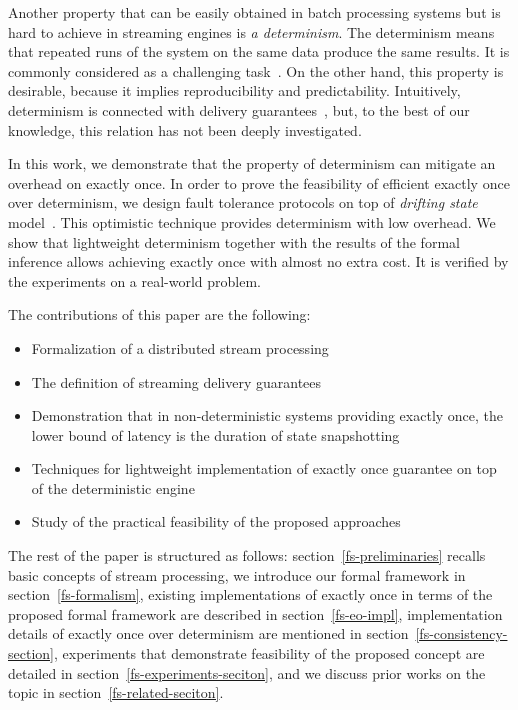 Another property that can be easily obtained in batch processing systems but is hard to achieve in streaming engines is {\em a determinism}. The determinism means that repeated runs of the system on the same data produce the same results. It is commonly considered as a challenging task~\cite{Zacheilas:2017:MDS:3093742.3093921}. On the other hand, this property is desirable, because it implies reproducibility and predictability. Intuitively, determinism is connected with delivery guarantees~\cite{Stonebraker:2005:RRS:1107499.1107504}, but, to the best of our knowledge, this relation has not been deeply investigated. 


In this work, we demonstrate that the property of determinism can mitigate an overhead on exactly once. In order to prove the feasibility of efficient exactly once over determinism, we design fault tolerance protocols on top of {\em drifting state} model~\cite{we2018adbis}. This optimistic technique provides determinism with low overhead. We show that lightweight determinism together with the results of the formal inference allows achieving exactly once with almost no extra cost. It is verified by the experiments on a real-world problem.

The contributions of this paper are the following: 
\begin{itemize}
    \item Formalization of a distributed stream processing
    \item The definition of streaming delivery guarantees 
    \item Demonstration that in non-deterministic systems providing exactly once, the lower bound of latency is the duration of state snapshotting
    \item Techniques for lightweight implementation of exactly once guarantee on top of the deterministic engine
    \item Study of the practical feasibility of the proposed approaches
\end{itemize}

The rest of the paper is structured as follows: section~\ref{fs-preliminaries} recalls basic concepts of stream processing, we introduce our formal framework in section~\ref{fs-formalism}, existing implementations of exactly once in terms of the proposed formal framework are described in section~\ref{fs-eo-impl}, implementation details of exactly once over determinism are mentioned in section~\ref{fs-consistency-section}, experiments that demonstrate feasibility of the proposed concept are detailed in section~\ref{fs-experiments-seciton}, and we discuss prior works on the topic in section~\ref{fs-related-seciton}. 
